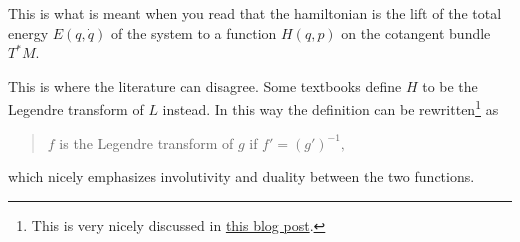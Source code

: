\documentclass[english,fontsize=11pt,paper=a5,oneside]{scrbook}
\theoremstyle{definition}
\newenvironment{remark}
  {\pushQED{\qed}\renewcommand{\qedsymbol}{$\lozenge$}\remarkx}
  {\popQED\endremarkx}
\begin{document}
\begin{remark}
  This is what is meant when you read that the hamiltonian is the lift of the total energy $E(q, \dot q)$ of the system to a function $H(q,p)$ on the cotangent bundle $T^*M$.
\end{remark}

\begin{remark}
  This is where the literature can disagree. Some textbooks define $H$ to be the Legendre transform of $L$ instead. In this way the definition can be rewritten\footnote{This is very nicely discussed in \href{https://web.archive.org/web/20211114232435/https://blog.jessriedel.com/2017/06/28/legendre-transform/}{this blog post}.} as
  \begin{quote}
  $f$ is the Legendre transform of $g$ if
  \(
    f' = (g')^{-1}, 
  \)
  \end{quote}
  which nicely emphasizes involutivity and duality between the two functions.
\end{remark}
\end{document}
